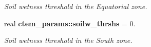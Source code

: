 \begin{DoxyCompactItemize}
\begin{DoxyCompactList}\small\item\em Soil wetness threshold in the Equatorial zone. \end{DoxyCompactList}\item 
\hypertarget{namespacectem__params_ae3cc62b58531c7d353cc8baac1c1fd6a}{}real {\bfseries ctem\+\_\+params\+::soilw\+\_\+thrshs} = 0.\label{namespacectem__params_ae3cc62b58531c7d353cc8baac1c1fd6a}

\begin{DoxyCompactList}\small\item\em Soil wetness threshold in the South zone. \end{DoxyCompactList}\end{DoxyCompactItemize}
